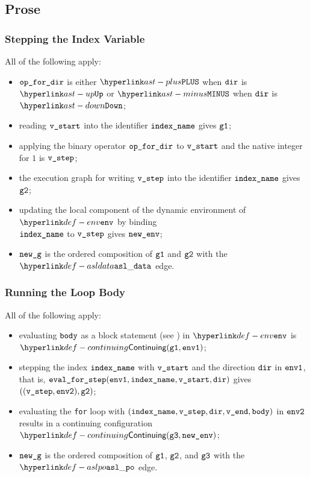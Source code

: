 \subsection{Prose}
\subsubsection{Stepping the Index Variable}
All of the following apply:
\begin{itemize}
  \item $\texttt{op\_for\_dir}$ is either $\PLUS$ when $\texttt{dir}$ is $\UP$ or $\MINUS$ when $\texttt{dir}$ is $\DOWN$;
  \item reading $\texttt{v\_start}$ into the identifier $\texttt{index\_name}$ gives $\texttt{g1}$;
  \item applying the binary operator $\texttt{op\_for\_dir}$ to $\texttt{v\_start}$ and the native integer for $1$ is $\texttt{v\_step}$;
  \item the execution graph for writing $\texttt{v\_step}$ into the identifier $\texttt{index\_name}$ gives $\texttt{g2}$;
  \item updating the local component of the dynamic environment of $\env$ by binding \\ $\texttt{index\_name}$ to $\texttt{v\_step}$
  gives $\texttt{new\_env}$;
  \item $\texttt{new\_g}$ is the ordered composition of $\texttt{g1}$ and $\texttt{g2}$ with the $\asldata$ edge.
\end{itemize}

\subsubsection{Running the Loop Body}
All of the following apply:
\begin{itemize}
  \item evaluating $\texttt{body}$ as a block statement (see ) in $\env$
  is \\ $\Continuing(\vgone, \envone)$\ProseTerminateAs{\ReturningConfig, \ThrowingConfig, \ErrorConfig};
  \item stepping the index $\texttt{index\_name}$ with $\texttt{v\_start}$ and the direction $\texttt{dir}$ in $\texttt{env1}$,
  that is, $\texttt{eval\_for\_step}(\texttt{env1}, \texttt{index\_name}, \texttt{v\_start}, \texttt{dir})$ gives $((\texttt{v\_step}, \texttt{env2}), \texttt{g2})$;
  \item evaluating the \texttt{for} loop with $(\texttt{index\_name}, \texttt{v\_step}, \texttt{dir}, \texttt{v\_end}, \texttt{body})$
  in $\texttt{env2}$ results in a continuing configuration $\Continuing(\vgthree, \newenv)$\ProseTerminateAs{\ReturningConfig, \ThrowingConfig, \ErrorConfig};
  \item $\texttt{new\_g}$ is the ordered composition of $\texttt{g1}$, $\texttt{g2}$, and $\texttt{g3}$ with the $\aslpo$
  edge.
\end{itemize}


